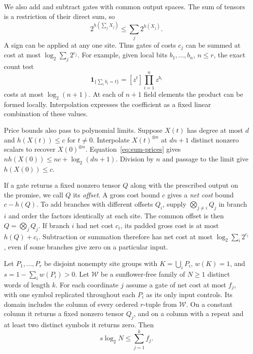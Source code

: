 We also add and subtract gates with common output spaces. The sum of
tensors is a restriction of their direct sum, so
\begin{equation}\label{eq:sum-prices}
              2^{h(\sum_j X_j)}\le \sum_j 2^{h(X_j)} .
\end{equation}
A sign can be applied at any one site. Thus gates of costs \(c_j\) can
be summed at cost at most \(\log_2\sum_j 2^{c_j}\). For example,
given local bits \(b_1,\ldots,b_n\), \(n\le r\), the exact count test
\begin{equation}\label{eq:count-test}
              \mathbf 1_{\{\sum_i b_i=t\}}=[z^t]\prod_{i=1}^n z^{b_i}
\end{equation}
costs at most \(\log_2(n+1)\). At each of \(n+1\) field elements the
product can be formed locally. Interpolation expresses the coefficient
as a fixed linear combination of these values.

Price bounds also pass to polynomial limits. Suppose \(X(t)\) has
degree at most \(d\) and \(h(X(t))\le c\) for \(t\ne0\).
Interpolate \(X(t)^{\otimes n}\) at \(dn+1\) distinct nonzero scalars
to recover \(X(0)^{\otimes n}\). Equation~\eqref{eq:sum-prices} gives
\(nh(X(0))\le nc+\log_2(dn+1)\). Division by \(n\) and passage to the
limit give \(h(X(0))\le c\).

If a gate returns a fixed nonzero tensor \(Q\) along with the prescribed
output on the promise, we call \(Q\) its \emph{offset}. A gross cost
bound \(c\) gives a \emph{net cost} bound \(c-h(Q)\).
To add branches with different offsets \(Q_i\), supply
\(\bigotimes_{j\ne i}Q_j\) in branch \(i\) and order the factors
identically at each site. The common offset is then
\(Q=\bigotimes_j Q_j\). If branch \(i\) had net cost \(c_i\), its
padded gross cost is at most \(h(Q)+c_i\). Subtraction or summation
therefore has net cost at most \(\log_2\sum_i 2^{c_i}\), even if some
branches give zero on a particular input.

\begin{lemma}\label{lem:diagonal}
Let \(P_1,\ldots,P_r\) be disjoint nonempty site groups with
\(K=\bigcup_iP_i\), \(w(K)=1\), and \(s=1-\sum_i w(P_i)>0\).
Let \(\mathcal W\) be a sunflower-free family of \(N\ge1\) distinct
words of length \(k\). For each coordinate \(j\) assume a gate of net
cost at most \(f_j\), with one symbol replicated throughout each
\(P_i\) as its only input controls. Its domain includes the column of
every ordered \(r\)-tuple from \(\mathcal W\). On a constant column it
returns a fixed nonzero tensor \(Q_j\), and on a column with a repeat
and at least two distinct symbols it returns zero. Then
\[
                     s\log_2 N\le \sum_{j=1}^k f_j .
\]
\end{lemma}

